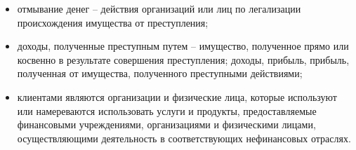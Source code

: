 \documentclass{article}
\begin{document}
\begin{itemize}[label={--}]
    \item отмывание денег -- действия организаций или лиц по легализации происхождения имущества от преступления;
    \item доходы, полученные преступным путем -- имущество, полученное прямо или косвенно в результате совершения преступления; доходы, прибыль, прибыль, полученная от имущества, полученного преступными действиями;
    \item клиентами являются организации и физические лица, которые используют или намереваются использовать услуги и продукты, предоставляемые финансовыми учреждениями, организациями и физическими лицами, осуществляющими деятельность в соответствующих нефинансовых отраслях.

\end{itemize}
\end{document}
